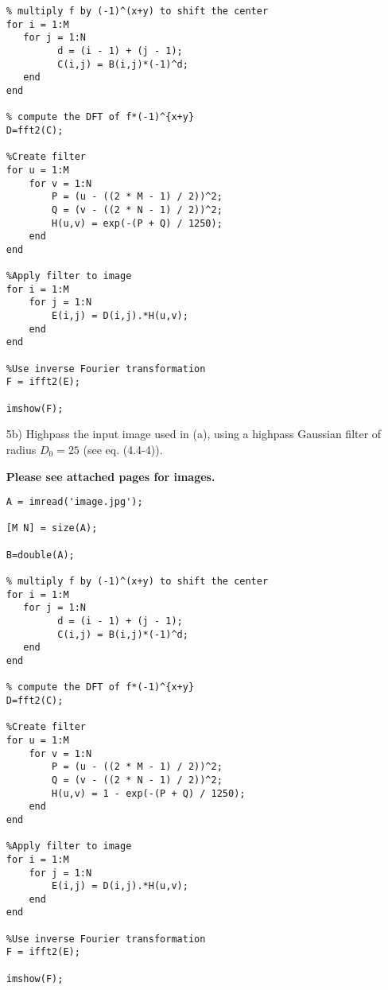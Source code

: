 \documentclass{article}
\begin{document}
\begin{enumerate}
\begin{lstlisting}
% multiply f by (-1)^(x+y) to shift the center 
for i = 1:M
   for j = 1:N
         d = (i - 1) + (j - 1);
         C(i,j) = B(i,j)*(-1)^d;
   end
end

% compute the DFT of f*(-1)^{x+y} 
D=fft2(C);

%Create filter
for u = 1:M
    for v = 1:N
        P = (u - ((2 * M - 1) / 2))^2;
        Q = (v - ((2 * N - 1) / 2))^2;
        H(u,v) = exp(-(P + Q) / 1250);
    end
end

%Apply filter to image
for i = 1:M
    for j = 1:N
        E(i,j) = D(i,j).*H(u,v);
    end
end

%Use inverse Fourier transformation
F = ifft2(E);

imshow(F);
\end{lstlisting}

\newpage
\item[5b)] Highpass the input image used in (a), using a highpass Gaussian filter
of radius $D_0=25$ (see eq. (4.4-4)). 

\textbf{Please see attached pages for images.}

\begin{lstlisting}
A = imread('image.jpg');

[M N] = size(A); 

B=double(A);

% multiply f by (-1)^(x+y) to shift the center 
for i = 1:M
   for j = 1:N
         d = (i - 1) + (j - 1);
         C(i,j) = B(i,j)*(-1)^d;
   end
end

% compute the DFT of f*(-1)^{x+y} 
D=fft2(C);

%Create filter
for u = 1:M
    for v = 1:N
        P = (u - ((2 * M - 1) / 2))^2;
        Q = (v - ((2 * N - 1) / 2))^2;
        H(u,v) = 1 - exp(-(P + Q) / 1250);
    end
end

%Apply filter to image
for i = 1:M
    for j = 1:N
        E(i,j) = D(i,j).*H(u,v);
    end
end

%Use inverse Fourier transformation
F = ifft2(E);

imshow(F);

\end{lstlisting}

\end{enumerate}
\end{document}
